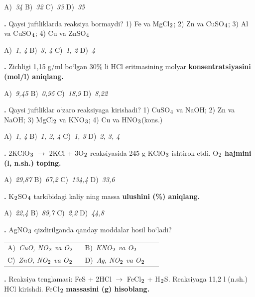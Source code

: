 \documentclass[11pt,a4paper]{article}
\renewcommand{\textsubscript}[1]{\ensuremath{_{\text{\fontsize{8}{8}\selectfont #1}}}}
\newcommand{\qn}[1]{\textbf{\fontsize{11.5}{13}\selectfont #1}}
\newcommand{\qsep}{\par\vspace{1pt}\noindent\rule{0pt}{0.4pt}\par\vspace{5pt}}
\begin{document}
\begin{multicols}{2}
\noindent A)~\textsl{34} \hfill B)~\textsl{32} \hfill C)~\textsl{33} \hfill D)~\textsl{35}\par
\qsep
\noindent\qn{12.} Qaysi juftliklarda reaksiya bormaydi? 1) Fe va MgCl\textsubscript{2}; 2) Zn va CuSO\textsubscript{4}; 3) Al va CuSO\textsubscript{4}; 4) Cu va ZnSO\textsubscript{4}

\noindent A)~\textsl{1, 4} \hfill B)~\textsl{3, 4} \hfill C)~\textsl{1, 2} \hfill D)~\textsl{4}\par
\qsep
\noindent\qn{13.} Zichligi 1,15 g/ml bo`lgan 30\% li HCl eritmasining molyar \textbf{konsentratsiyasini (mol/l) aniqlang.}

\noindent A)~\textsl{9,45} \hfill B)~\textsl{0,95} \hfill C)~\textsl{18,9} \hfill D)~\textsl{8,22}\par
\qsep
\noindent\qn{14.} Qaysi juftliklar o`zaro reaksiyaga kirishadi? 1) CuSO\textsubscript{4} va NaOH; 2) Zn va NaOH; 3) MgCl\textsubscript{2} va KNO\textsubscript{3}; 4) Cu va HNO\textsubscript{3}(kons.)

\noindent A)~\textsl{1, 4} \hfill B)~\textsl{1, 2, 4} \hfill C)~\textsl{1, 3} \hfill D)~\textsl{2, 3, 4}\par
\qsep
\noindent\qn{15.} 2KClO\textsubscript{3} $\to$ 2KCl + 3O\textsubscript{2} reaksiyasida 245 g KClO\textsubscript{3} ishtirok etdi. O\textsubscript{2} \textbf{hajmini (l, n.sh.) toping.}

\noindent A)~\textsl{29,87} \hfill B)~\textsl{67,2} \hfill C)~\textsl{134,4} \hfill D)~\textsl{33,6}\par
\qsep
\noindent\qn{16.} K\textsubscript{2}SO\textsubscript{4} tarkibidagi kaliy ning massa \textbf{ulushini (\%) aniqlang.}

\noindent A)~\textsl{22,4} \hfill B)~\textsl{89,7} \hfill C)~\textsl{2,2} \hfill D)~\textsl{44,8}\par
\qsep
\noindent\qn{17.} AgNO\textsubscript{3} qizdirilganda qanday moddalar hosil bo`ladi?

\noindent\begin{tabular}{@{}p{0.47\linewidth}@{}p{0.47\linewidth}@{}}
A)~\textsl{CuO, NO\textsubscript{2} va O\textsubscript{2}} & B)~\textsl{KNO\textsubscript{2} va O\textsubscript{2}} \\
C)~\textsl{ZnO, NO\textsubscript{2} va O\textsubscript{2}} & D)~\textsl{Ag, NO\textsubscript{2} va O\textsubscript{2}} \\
\end{tabular}\par
\qsep
\noindent\qn{18.} Reaksiya tenglamasi: FeS + 2HCl $\to$ FeCl\textsubscript{2} + H\textsubscript{2}S. Reaksiyaga 11,2 l (n.sh.) HCl kirishdi. FeCl\textsubscript{2} \textbf{massasini (g) hisoblang.}


\end{multicols}
\end{document}
